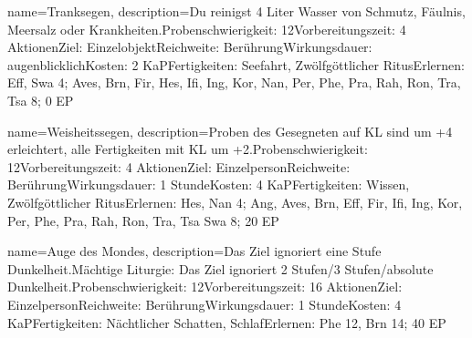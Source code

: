 {
    name={Tranksegen},
    description={Du reinigst 4 Liter Wasser von Schmutz, Fäulnis, Meersalz oder Krankheiten.\newline Probenschwierigkeit: 12\newline Vorbereitungszeit: 4 Aktionen\newline Ziel: Einzelobjekt\newline Reichweite: Berührung\newline Wirkungsdauer: augenblicklich\newline Kosten: 2 KaP\newline Fertigkeiten: Seefahrt, Zwölfgöttlicher Ritus\newline Erlernen: Eff, Swa 4; Aves, Brn, Fir, Hes, Ifi, Ing, Kor, Nan, Per, Phe, Pra, Rah, Ron, Tra, Tsa 8; 0 EP}
}


{
    name={Weisheitssegen},
    description={Proben des Gesegneten auf KL sind um +4 erleichtert, alle Fertigkeiten mit KL um +2.\newline Probenschwierigkeit: 12\newline Vorbereitungszeit: 4 Aktionen\newline Ziel: Einzelperson\newline Reichweite: Berührung\newline Wirkungsdauer: 1 Stunde\newline Kosten: 4 KaP\newline Fertigkeiten: Wissen, Zwölfgöttlicher Ritus\newline Erlernen: Hes, Nan 4; Ang, Aves, Brn, Eff, Fir, Ifi, Ing, Kor, Per, Phe, Pra, Rah, Ron, Tra, Tsa Swa 8; 20 EP}
}


{
    name={Auge des Mondes},
    description={Das Ziel ignoriert eine Stufe Dunkelheit.\newline Mächtige Liturgie: Das Ziel ignoriert 2 Stufen/3 Stufen/absolute Dunkelheit.\newline Probenschwierigkeit: 12\newline Vorbereitungszeit: 16 Aktionen\newline Ziel: Einzelperson\newline Reichweite: Berührung\newline Wirkungsdauer: 1 Stunde\newline Kosten: 4 KaP\newline Fertigkeiten: Nächtlicher Schatten, Schlaf\newline Erlernen: Phe 12, Brn 14; 40 EP}
}


